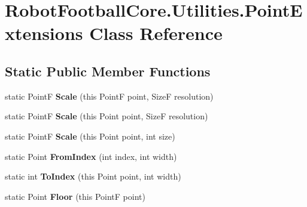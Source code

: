\hypertarget{class_robot_football_core_1_1_utilities_1_1_point_extensions}{\section{Robot\-Football\-Core.\-Utilities.\-Point\-Extensions Class Reference}
\label{class_robot_football_core_1_1_utilities_1_1_point_extensions}
}
\subsection*{Static Public Member Functions}
\begin{DoxyCompactItemize}
\item 
\hypertarget{class_robot_football_core_1_1_utilities_1_1_point_extensions_ab011c8ca764ef1a588a26bc7dbb4a1bc}{static Point\-F {\bfseries Scale} (this Point\-F point, Size\-F resolution)}\label{class_robot_football_core_1_1_utilities_1_1_point_extensions_ab011c8ca764ef1a588a26bc7dbb4a1bc}

\item 
\hypertarget{class_robot_football_core_1_1_utilities_1_1_point_extensions_a0942da1187afa8a141b60be1676219b9}{static Point\-F {\bfseries Scale} (this Point point, Size\-F resolution)}\label{class_robot_football_core_1_1_utilities_1_1_point_extensions_a0942da1187afa8a141b60be1676219b9}

\item 
\hypertarget{class_robot_football_core_1_1_utilities_1_1_point_extensions_a66096fa35fa8d8104f4b580abc0aa432}{static Point\-F {\bfseries Scale} (this Point point, int size)}\label{class_robot_football_core_1_1_utilities_1_1_point_extensions_a66096fa35fa8d8104f4b580abc0aa432}

\item 
\hypertarget{class_robot_football_core_1_1_utilities_1_1_point_extensions_aa90b2118f473504ccd7b154d14a84a1c}{static Point {\bfseries From\-Index} (int index, int width)}\label{class_robot_football_core_1_1_utilities_1_1_point_extensions_aa90b2118f473504ccd7b154d14a84a1c}

\item 
\hypertarget{class_robot_football_core_1_1_utilities_1_1_point_extensions_af03007ea9cc5b7fd1e00742407f234af}{static int {\bfseries To\-Index} (this Point point, int width)}\label{class_robot_football_core_1_1_utilities_1_1_point_extensions_af03007ea9cc5b7fd1e00742407f234af}

\item 
\hypertarget{class_robot_football_core_1_1_utilities_1_1_point_extensions_a70219046a044acb2c9dc6799292dbf08}{static Point {\bfseries Floor} (this Point\-F point)}\label{class_robot_football_core_1_1_utilities_1_1_point_extensions_a70219046a044acb2c9dc6799292dbf08}

\end{DoxyCompactItemize}


